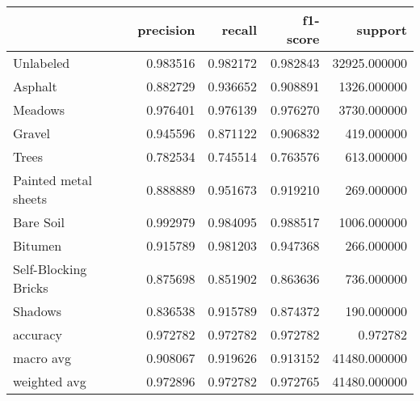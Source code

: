 \begin{tabular}{lrrrr}
\toprule
{} &  precision &    recall &  f1-score &       support \\
\midrule
Unlabeled            &   0.983516 &  0.982172 &  0.982843 &  32925.000000 \\
Asphalt              &   0.882729 &  0.936652 &  0.908891 &   1326.000000 \\
Meadows              &   0.976401 &  0.976139 &  0.976270 &   3730.000000 \\
Gravel               &   0.945596 &  0.871122 &  0.906832 &    419.000000 \\
Trees                &   0.782534 &  0.745514 &  0.763576 &    613.000000 \\
Painted metal sheets &   0.888889 &  0.951673 &  0.919210 &    269.000000 \\
Bare Soil            &   0.992979 &  0.984095 &  0.988517 &   1006.000000 \\
Bitumen              &   0.915789 &  0.981203 &  0.947368 &    266.000000 \\
Self-Blocking Bricks &   0.875698 &  0.851902 &  0.863636 &    736.000000 \\
Shadows              &   0.836538 &  0.915789 &  0.874372 &    190.000000 \\
accuracy             &   0.972782 &  0.972782 &  0.972782 &      0.972782 \\
macro avg            &   0.908067 &  0.919626 &  0.913152 &  41480.000000 \\
weighted avg         &   0.972896 &  0.972782 &  0.972765 &  41480.000000 \\
\bottomrule
\end{tabular}
